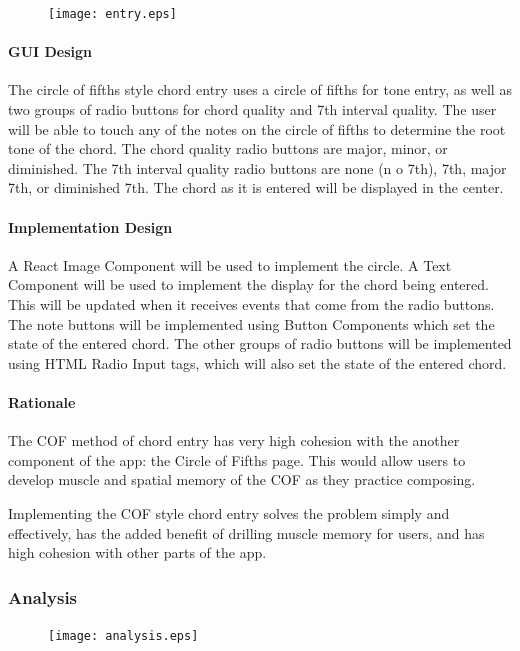 \documentclass[onecolumn, draftclsnofoot,10pt, compsoc]{IEEEtran}
\begin{document}
\begin{figure}[H]
    \centering
    \texttt{[image: entry.eps]}
\end{figure}

\paragraph{GUI Design}
The circle of fifths style chord entry uses a circle of fifths for tone entry, as well as two groups of radio buttons for chord quality and 7th interval quality. 
The user will be able to touch any of the notes on the circle of fifths to determine the root tone of the chord.
The chord quality radio buttons are major, minor, or diminished.
The 7th interval quality radio buttons are none (n o 7th), 7th, major 7th, or diminished 7th.
The chord as it is entered will be displayed in the center.

\paragraph{Implementation Design}
A React Image Component will be used to implement the circle.
A Text Component will be used to implement the display for the chord being entered.
This will be updated when it receives events that come from the radio buttons.
The note buttons will be implemented using Button Components which set the state of the entered chord.
The other groups of radio buttons will be implemented using HTML Radio Input tags, which will also set the state of the entered chord.

\paragraph{Rationale}
The COF method of chord entry has very high cohesion with the another component of the app: the Circle of Fifths page.
This would allow users to develop muscle and spatial memory of the COF as they practice composing.

Implementing the COF style chord entry solves the problem simply and effectively, has the added benefit of drilling muscle memory for users, and has high cohesion with other parts of the app.

\subsubsection{Analysis}

\begin{figure}[H]
    \centering
    \texttt{[image: analysis.eps]}
\end{figure}
\end{document}
